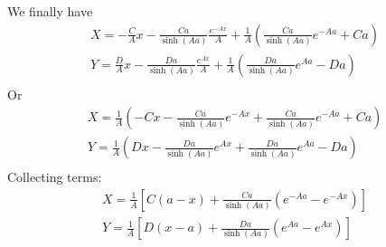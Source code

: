 \documentclass[11pt]{article}
\begin{document}
We finally have
\begin{equation}\begin{aligned}
X  = -\frac{C}{A} x - \frac{Ca}{\sinh(Aa)} \frac{e^{-Ax}}{A} + \frac{1}{A} \left( \frac{Ca}{\sinh(Aa)} e^{-A a} +C a \right) \\
Y  =  \frac{D}{A} x - \frac{Da}{\sinh(Aa)} \frac{e^{ Ax}}{A} + \frac{1}{A} \left( \frac{Da}{\sinh(Aa)} e^{ A a} -D a \right) \\
\end{aligned} \end{equation}
Or
\begin{equation}\begin{aligned}
X  = \frac{1}{A} \left( -C x - \frac{Ca}{\sinh(Aa)} e^{-Ax} + \frac{Ca}{\sinh(Aa)} e^{-A a} +C a \right) \\
Y  = \frac{1}{A} \left(  D x - \frac{Da}{\sinh(Aa)} e^{ Ax} + \frac{Da}{\sinh(Aa)} e^{ A a} -D a \right) \\
\end{aligned} \end{equation}
Collecting terms:
\begin{equation}\begin{aligned}
X  = \frac{1}{A} \left[ C(a-x) + \frac{Ca}{\sinh(Aa)}(e^{-A a}-e^{-Ax}) \right] \\
Y  = \frac{1}{A} \left[ D(x-a) + \frac{Da}{\sinh(Aa)}(e^{ A a}-e^{ Ax}) \right] \\
\end{aligned} \end{equation}
\end{document}
